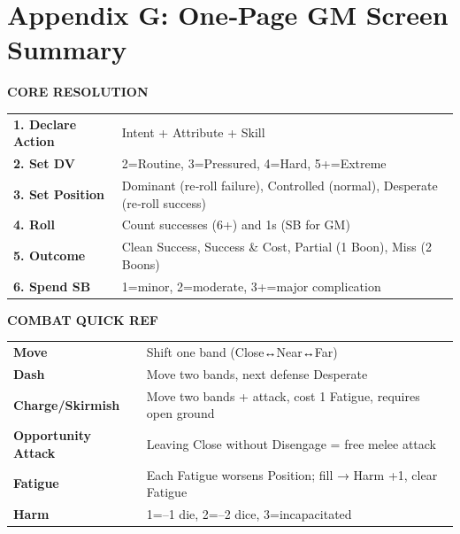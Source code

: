 \clearpage
\section*{Appendix G: One‑Page GM Screen Summary}
\label{app:gm-screen}

\begin{tcolorbox}[title=\textbf{Fate’s Edge – GM Screen}, colback=blue!5!white, colframe=blue!75!black, sharp corners, fonttitle=\bfseries, center title]
\begin{center}
\large\textbf{CORE RESOLUTION}
\end{center}
\begin{tabularx}{\textwidth}{X|X}
\hline
\textbf{1. Declare Action} & Intent + Attribute + Skill \\
\textbf{2. Set DV} & 2=Routine, 3=Pressured, 4=Hard, 5+=Extreme \\
\textbf{3. Set Position} & Dominant (re‑roll failure), Controlled (normal), Desperate (re‑roll success) \\
\textbf{4. Roll} & Count successes (6+) and 1s (SB for GM) \\
\textbf{5. Outcome} & Clean Success, Success \& Cost, Partial (1 Boon), Miss (2 Boons) \\
\textbf{6. Spend SB} & 1=minor, 2=moderate, 3+=major complication \\
\hline
\end{tabularx}

\vspace{0.5em}
\begin{center}
\large\textbf{COMBAT QUICK REF}
\end{center}
\begin{tabularx}{\textwidth}{X|X}
\hline
\textbf{Move} & Shift one band (Close↔Near↔Far) \\
\textbf{Dash} & Move two bands, next defense Desperate \\
\textbf{Charge/Skirmish} & Move two bands + attack, cost 1 Fatigue, requires open ground \\
\textbf{Opportunity Attack} & Leaving Close without Disengage = free melee attack \\
\textbf{Fatigue} & Each Fatigue worsens Position; fill → Harm +1, clear Fatigue \\
\textbf{Harm} & 1=–1 die, 2=–2 dice, 3=incapacitated \\
\hline
\end{tabularx}


\end{tcolorbox}
